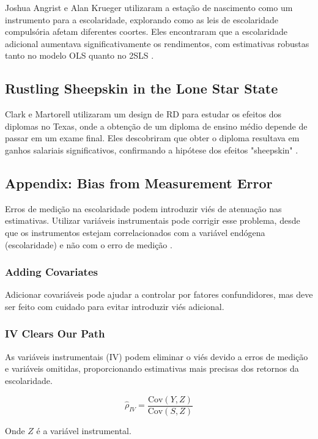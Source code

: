 \documentclass[a4paper,12pt]{article}[abntex2]
\begin{document}
Joshua Angrist e Alan Krueger utilizaram a estação de nascimento como um instrumento para a escolaridade, explorando como as leis de escolaridade compulsória afetam diferentes coortes. Eles encontraram que a escolaridade adicional aumentava significativamente os rendimentos, com estimativas robustas tanto no modelo OLS quanto no 2SLS  .

\subsection{Rustling Sheepskin in the Lone Star State}

Clark e Martorell utilizaram um design de RD para estudar os efeitos dos diplomas no Texas, onde a obtenção de um diploma de ensino médio depende de passar em um exame final. Eles descobriram que obter o diploma resultava em ganhos salariais significativos, confirmando a hipótese dos efeitos "sheepskin"  .

\subsection*{Appendix: Bias from Measurement Error}

Erros de medição na escolaridade podem introduzir viés de atenuação nas estimativas. Utilizar variáveis instrumentais pode corrigir esse problema, desde que os instrumentos estejam correlacionados com a variável endógena (escolaridade) e não com o erro de medição .

\subsubsection*{Adding Covariates}

Adicionar covariáveis pode ajudar a controlar por fatores confundidores, mas deve ser feito com cuidado para evitar introduzir viés adicional.

\subsubsection*{IV Clears Our Path}

As variáveis instrumentais (IV) podem eliminar o viés devido a erros de medição e variáveis omitidas, proporcionando estimativas mais precisas dos retornos da escolaridade.

\begin{equation}
    \hat{\rho}_{IV} = \frac{\text{Cov}(Y, Z)}{\text{Cov}(S, Z)}
\end{equation}

Onde \(Z\) é a variável instrumental.
\end{document}
